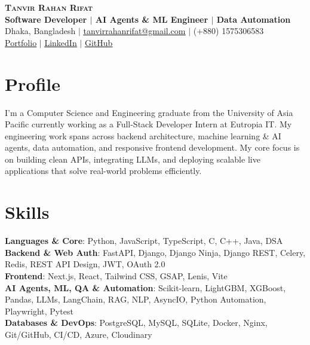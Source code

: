 \documentclass[letterpaper,10.5pt]{article}
\begin{document}
\begin{center}
    \textbf{\Huge \scshape Tanvir Rahan Rifat} \\ \vspace{5pt}
    \small \textbf{Software Developer $|$ AI Agents \& ML Engineer $|$ Data Automation} \\ \vspace{3pt}
    \small Dhaka, Bangladesh $|$ \href{mailto:tanvirrahanrifat@gmail.com}{\underline{tanvirrahanrifat@gmail.com}} $|$ (+880) 1575306583 \\ \vspace{2pt}
    \href{https://tanvirrifat.me/}{\underline{Portfolio}} $|$ 
    \href{https://www.linkedin.com/in/tanvirrahanrifat/}{\underline{LinkedIn}} $|$
    \href{https://github.com/tanvirRahan}{\underline{GitHub}}
\end{center}

\section{Profile}
\small{I'm a Computer Science and Engineering graduate from the University of Asia Pacific currently working as a Full-Stack Developer Intern at Eutropia IT. My engineering work spans across backend architecture, machine learning \& AI agents, data automation, and responsive frontend development. My core focus is on building clean APIs, integrating LLMs, and deploying scalable live applications that solve real-world problems efficiently.}

\section{Skills}
\begin{itemize}[leftmargin=0.15in, label={}]
    \small{\item{
     \textbf{Languages \& Core}{: Python, JavaScript, TypeScript, C, C++, Java, DSA} \\
     \textbf{Backend \& Web Auth}{: FastAPI, Django, Django Ninja, Django REST, Celery, Redis, REST API Design, JWT, OAuth 2.0} \\
     \textbf{Frontend}{: Next.js, React, Tailwind CSS, GSAP, Lenis, Vite} \\
     \textbf{AI Agents, ML, QA \& Automation}{: Scikit-learn, LightGBM, XGBoost, Pandas, LLMs, LangChain, RAG, NLP, AsyncIO, Python Automation, Playwright, Pytest} \\
     \textbf{Databases \& DevOps}{: PostgreSQL, MySQL, SQLite, Docker, Nginx, Git/GitHub, CI/CD, Azure, Cloudinary}
    }}
\end{itemize}
\end{document}
